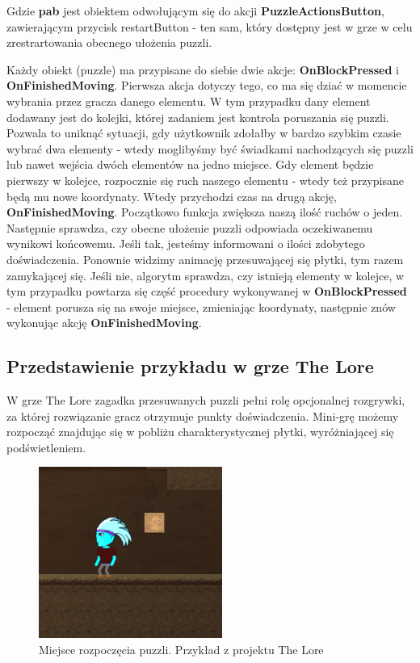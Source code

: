 \documentclass[oneside,polski,logo]{amuthesis}
\begin{document}
Gdzie \textbf{pab} jest obiektem odwołującym się do akcji \textbf{PuzzleActionsButton}, zawierającym przycisk restartButton - ten sam, który dostępny jest w grze w celu zrestrartowania obecnego ułożenia puzzli.

Każdy obiekt (puzzle) ma przypisane do siebie dwie akcje: \textbf{OnBlockPressed} i \textbf{OnFinishedMoving}. Pierwsza akcja dotyczy tego, co ma się dziać w momencie wybrania przez gracza danego elementu. W tym przypadku dany element dodawany jest do kolejki, której zadaniem jest kontrola poruszania się puzzli. Pozwala to uniknąć sytuacji, gdy użytkownik zdołałby w bardzo szybkim czasie wybrać dwa elementy - wtedy moglibyśmy być świadkami nachodzących się puzzli lub nawet wejścia dwóch elementów na jedno miejsce. Gdy element będzie pierwszy w kolejce, rozpocznie się ruch naszego elementu - wtedy też przypisane będą mu nowe koordynaty. Wtedy przychodzi czas na drugą akcję, \textbf{OnFinishedMoving}. Początkowo funkcja zwiększa naszą ilość ruchów o jeden. Następnie sprawdza, czy obecne ułożenie puzzli odpowiada oczekiwanemu wynikowi końcowemu. Jeśli tak, jesteśmy informowani o ilości zdobytego doświadczenia. Ponownie widzimy animację przesuwającej się płytki, tym razem zamykającej się. Jeśli nie, algorytm sprawdza, czy istnieją elementy w kolejce, w tym przypadku powtarza się część procedury wykonywanej w \textbf{OnBlockPressed} - element porusza się na swoje miejsce, zmieniając koordynaty, następnie znów wykonując akcję \textbf{OnFinishedMoving}.

\subsection{Przedstawienie przykładu w grze The Lore}
W grze The Lore zagadka przesuwanych puzzli pełni rolę opcjonalnej rozgrywki, za której rozwiązanie gracz otrzymuje punkty doświadczenia. Mini-grę możemy rozpocząć znajdując się w pobliżu charakterystycznej płytki, wyróżniającej się podświetleniem.
\begin{figure}[h]
	\centering
	\includegraphics[width=6cm]{images/tyrek/the_lore_puzzle_lvl1.png}
	\caption{Miejsce rozpoczęcia puzzli. Przykład z projektu The Lore}
\end{figure}
\end{document}
